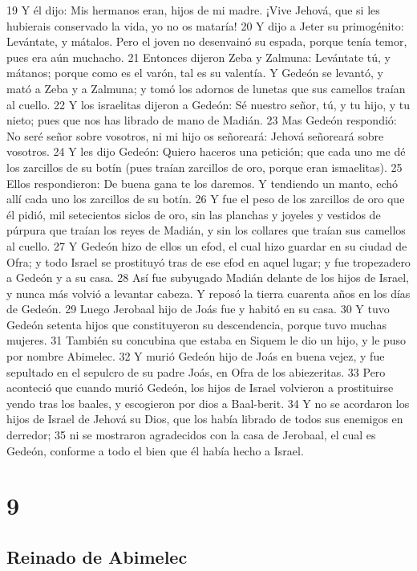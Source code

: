 19 Y él dijo: Mis hermanos eran, hijos de mi madre. ¡Vive Jehová, que si les hubierais conservado la vida, yo no os mataría!
20 Y dijo a Jeter su primogénito: Levántate, y mátalos. Pero el joven no desenvainó su espada, porque tenía temor, pues era aún muchacho.
21 Entonces dijeron Zeba y Zalmuna: Levántate tú, y mátanos; porque como es el varón, tal es su valentía. Y Gedeón se levantó, y mató a Zeba y a Zalmuna; y tomó los adornos de lunetas que sus camellos traían al cuello.
22 Y los israelitas dijeron a Gedeón: Sé nuestro señor, tú, y tu hijo, y tu nieto; pues que nos has librado de mano de Madián.
23 Mas Gedeón respondió: No seré señor sobre vosotros, ni mi hijo os señoreará: Jehová señoreará sobre vosotros.
24 Y les dijo Gedeón: Quiero haceros una petición; que cada uno me dé los zarcillos de su botín (pues traían zarcillos de oro, porque eran ismaelitas).
25 Ellos respondieron: De buena gana te los daremos. Y tendiendo un manto, echó allí cada uno los zarcillos de su botín.
26 Y fue el peso de los zarcillos de oro que él pidió, mil setecientos siclos de oro,  sin las planchas y joyeles y vestidos de púrpura que traían los reyes de Madián, y sin los collares que traían sus camellos al cuello.
27 Y Gedeón hizo de ellos un efod, el cual hizo guardar en su ciudad de Ofra; y todo Israel se prostituyó tras de ese efod en aquel lugar; y fue tropezadero a Gedeón y a su casa.
28 Así fue subyugado Madián delante de los hijos de Israel, y nunca más volvió a levantar cabeza. Y reposó la tierra cuarenta años en los días de Gedeón.
29 Luego Jerobaal hijo de Joás fue y habitó en su casa.
30 Y tuvo Gedeón setenta hijos que constituyeron su descendencia, porque tuvo muchas mujeres.
31 También su concubina que estaba en Siquem le dio un hijo, y le puso por nombre Abimelec.
32 Y murió Gedeón hijo de Joás en buena vejez, y fue sepultado en el sepulcro de su padre Joás, en Ofra de los abiezeritas.
33 Pero aconteció que cuando murió Gedeón, los hijos de Israel volvieron a prostituirse yendo tras los baales, y escogieron por dios a Baal-berit.
34 Y no se acordaron los hijos de Israel de Jehová su Dios, que los había librado de todos sus enemigos en derredor;
35 ni se mostraron agradecidos con la casa de Jerobaal, el cual es Gedeón, conforme a todo el bien que él había hecho a Israel.

\chapter{9}

\section*{Reinado de Abimelec}


